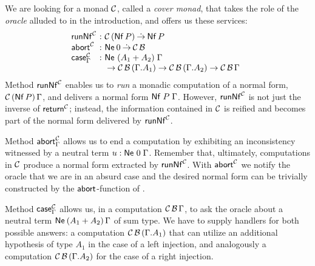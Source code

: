 \documentclass[sigplan,screen,fleqn,review]{acmart} %
\begin{document}
We are looking for a monad $\C$, called a \emph{cover monad}, that
takes the role of the \emph{oracle} alluded to in the introduction,
and offers us these services:
\[
\begin{array}{l@{~}c@{~}l@{\quad}l}
\trunNf[\C] & : & \C\,(\tNf\, P) \todot \tNf\, P
\\
\tabort^\C & : & \tNe\, \tyzero \todot \C\,\B
\\
\tcase^\C_\Gamma & : & \Ne {(A_1 + A_2)} \Gamma
\\
  && {} \to \C\,\B\,(\cext \Gamma {A_1})
  \to \C\,\B\,(\cext \Gamma {A_2})
  \to \C\,\B\,\Gamma
\\
\end{array}
\]
Method $\trunNf[\C]$ enables us to \emph{run} a monadic computation of
a normal form, $\C\,(\tNf\,P)\,\Gamma$, and delivers a normal form
$\Nf P \Gamma$.  However, $\trunNf[\C]$ is not just the inverse of
$\treturn[\C]$; instead, the information contained in $\C$ is reified and
becomes part of the normal form delivered by $\trunNf[\C]$.

Method $\tabort^\C_\Gamma$ allows us to end a computation by exhibiting an
inconsistency witnessed by a neutral term $u : \Ne 0 \Gamma$.
Remember that, ultimately, computations in $\C$ produce a normal form
extracted by $\trunNf[\C]$.  With $\tabort^\C$ we notify the oracle
that we are in an absurd case and the desired normal form can be
trivially constructed by the $\tabort$-function of .

Method $\tcase^\C_\Gamma$ allows us, in a computation
$\C\,\B\,\Gamma$,
to ask the oracle about a neutral
term $\NeP{A_1 + A_2}\Gamma$ of sum type.  We have to supply
handlers for both possible answers:
a computation $\C\,\B\,(\cext\Gamma{A_1})$ that can utilize an
additional hypothesis of type $A_1$ in the case of a left injection,
and analogously a computation $\C\,\B\,(\cext\Gamma{A_2})$ for the
case of a right injection.
\end{document}
